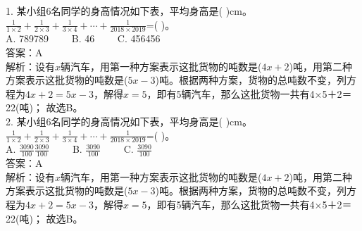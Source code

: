 \documentclass [UTF8]{ctexart}
\begin{document}
1. 某小组6名同学的身高情况如下表，平均身高是( )cm。\( \displaystyle \frac{1}{1\times 2}+\frac{1}{2\times 3}+\frac{1}{3\times 4}+\cdots +\frac{1}{2018\times 2019}\)=( )。\\
A. 789789　　 B. 46　　 C. 456456　　 \\
答案：A\\
解析：设有\( x\)辆汽车，用第一种方案表示这批货物的吨数是(\( 4x+2\))吨，用第二种方案表示这批货物的吨数是(\( 5x-3\))吨。根据两种方案，货物的总吨数不变，列方程为\( 4x+2=5x-3\)，解得\( x=5\)，即有5辆汽车，那么这批货物一共有4×5＋2＝22(吨)； 故选B。\\
2. 某小组6名同学的身高情况如下表，平均身高是( )cm。\( \displaystyle \frac{1}{1\times 2}+\frac{1}{2\times 3}+\frac{1}{3\times 4}+\cdots +\frac{1}{2018\times 2019}\)=( )。\\
A. \( \frac{3090}{100}\)\( \frac{3090}{100}\)　　 B. \( \frac{3090}{100}\)　　 C. \( \frac{3090}{100}\)　　 \\
答案：A\\
解析：设有\( x\)辆汽车，用第一种方案表示这批货物的吨数是(\( 4x+2\))吨，用第二种方案表示这批货物的吨数是(\( 5x-3\))吨。根据两种方案，货物的总吨数不变，列方程为\( 4x+2=5x-3\)，解得\( x=5\)，即有5辆汽车，那么这批货物一共有4×5＋2＝22(吨)； 故选B。\\
 
\end{document}
